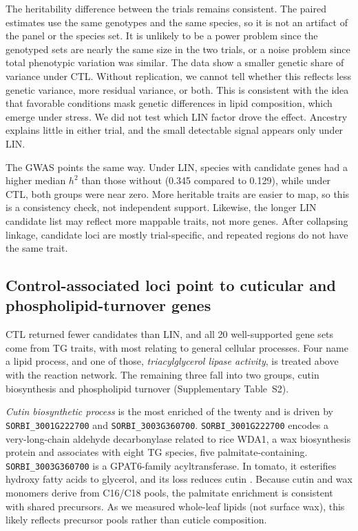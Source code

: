 \documentclass[9pt,twocolumn,twoside]{rilabRxiv}
\begin{document}
The heritability difference between the trials remains consistent. The paired estimates use the same genotypes and the same species, so it is not an artifact of the panel or the species set. It is unlikely to be a power problem since the genotyped sets are nearly the same size in the two trials, or a noise problem since total phenotypic variation was similar. The data show a smaller genetic share of variance under CTL. Without replication, we cannot tell whether this reflects less genetic variance, more residual variance, or both. This is consistent with the idea that favorable conditions mask genetic differences in lipid composition, which emerge under stress. We did not test which LIN factor drove the effect. Ancestry explains little in either trial, and the small detectable signal appears only under LIN.

The GWAS points the same way. Under LIN, species with candidate genes had a higher median $h^2$ than those without (0.345 compared to 0.129), while under CTL, both groups were near zero. More heritable traits are easier to map, so this is a consistency check, not independent support. Likewise, the longer LIN candidate list may reflect more mappable traits, not more genes. After collapsing linkage, candidate loci are mostly trial-specific, and repeated regions do not have the same trait.

\subsection*{Control-associated loci point to cuticular and phospholipid-turnover genes}

CTL returned fewer candidates than LIN, and all 20 well-supported gene sets come from TG traits, with most relating to general cellular processes. Four name a lipid process, and one of those, \textit{triacylglycerol lipase activity}, is treated above with the reaction network. The remaining three fall into two groups, cutin biosynthesis and phospholipid turnover (Supplementary Table~S2).

\textit{Cutin biosynthetic process} is the most enriched of the twenty and is driven by \texttt{SORBI\_3001G222700} and \texttt{SORBI\_3003G360700}. \texttt{SORBI\_3001G222700} encodes a very-long-chain aldehyde decarbonylase related to rice WDA1, a wax biosynthesis protein \citep{Jung2006WDA1} and associates with eight TG species, five palmitate-containing. \texttt{SORBI\_3003G360700} is a GPAT6-family acyltransferase. In tomato, it esterifies hydroxy fatty acids to glycerol, and its loss reduces cutin \citep{Petit2016GPAT6}. Because cutin and wax monomers derive from C16/C18 pools, the palmitate enrichment is consistent with shared precursors. As we measured whole-leaf lipids (not surface wax), this likely reflects precursor pools rather than cuticle composition.
\end{document}
